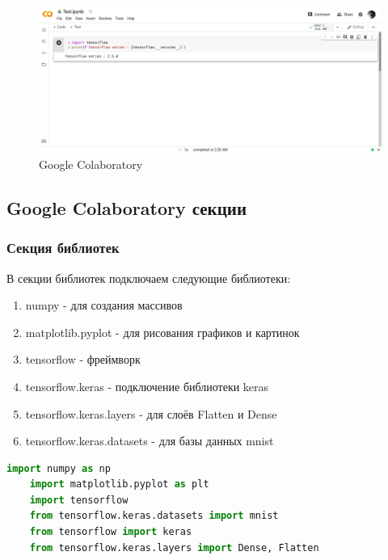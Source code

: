 \begin{figure}[!htbp]
    \centering
    \includegraphics[width=16cm]
    {../_INCLUDES/main/4/GoogleColaboratory.png}
    \caption{Google Colaboratory}
    \label{fig:4_GoogleColaboratory}
\end{figure}



\subsection{Google Colaboratory секции}



\subsubsection{Секция библиотек}

В секции библиотек подключаем следующие библиотеки:

\begin{enumerate}
    \item numpy - для создания массивов
    \item matplotlib.pyplot - для рисования графиков и картинок
    \item tensorflow - фреймворк
    \item tensorflow.keras - подключение библиотеки keras
    \item tensorflow.keras.layers - для слоёв Flatten и Dense
    \item tensorflow.keras.datasets - для базы данных mnist
\end{enumerate}

\begin{lstlisting}[language=Python,]
    import numpy as np
    import matplotlib.pyplot as plt
    import tensorflow
    from tensorflow.keras.datasets import mnist
    from tensorflow import keras
    from tensorflow.keras.layers import Dense, Flatten
\end{lstlisting}



